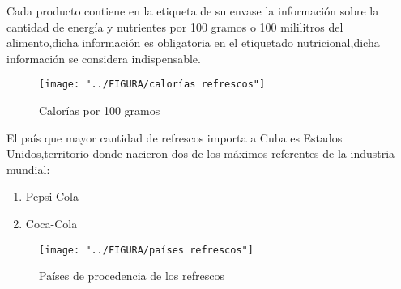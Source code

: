 \documentclass[10pt]{beamer}
\begin{document}
   	
   	\begin{frame}
   		
   		Cada producto contiene en la etiqueta de su envase la información sobre la cantidad de energía y nutrientes por 100  gramos o 100 mililitros del alimento,dicha información es obligatoria en el etiquetado nutricional,dicha información se considera indispensable.
   		
   		
   		\begin{figure}
   			\centering
   			\texttt{[image: "../FIGURA/calorías refrescos"]}
   			\caption{Calorías por 100 gramos}
   			\label{fig:calorias-refrescos}
   		\end{figure}
   		
   	\end{frame}
   	
   		
   	\begin{frame}
   		
   		El país que mayor cantidad de refrescos importa a Cuba es Estados Unidos,territorio donde nacieron dos de los máximos referentes de la industria mundial:
   		
   		\begin{enumerate}
   			\item{Pepsi-Cola}
   			\item{Coca-Cola}
   		\end{enumerate}
   		
   		\begin{figure}
   			\centering
   			\texttt{[image: "../FIGURA/países refrescos"]}
   			\caption{Países de procedencia de los refrescos}
   			\label{fig:paises-refrescos}
   		\end{figure}
   		
   	\end{frame}
   	
\end{document}
